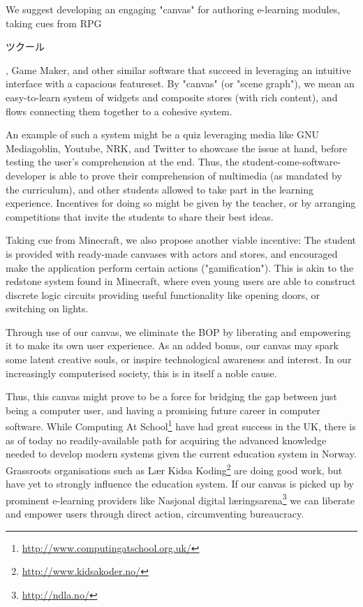 We suggest developing an engaging "canvas"  for authoring e-learning modules, 
taking cues from RPG\begin{CJK}{UTF8}{min}ツクール\end{CJK}, Game Maker, and 
other similar software that succeed in leveraging an intuitive interface with 
a capacious featureset. By "canvas" (or "scene graph"), we mean an 
easy-to-learn system of widgets and composite stores (with rich content), and 
flows connecting them together to a cohesive system. 

An example of such a system might be a quiz leveraging media like GNU 
Mediagoblin, Youtube, NRK, and Twitter to showcase the issue at hand, before 
testing the user's comprehension at the end. Thus, the 
student-come-software-developer is able to prove their comprehension of 
multimedia (as mandated by the curriculum), and other students allowed to take 
part in the learning experience. Incentives for doing so might be given by the 
teacher, or by arranging competitions that invite the students to share their 
best ideas.

Taking cue from Minecraft, we also propose another viable incentive: The student
is provided with ready-made canvases with actors and stores, and encouraged make
the application perform certain actions ("gamification"). This is akin to the
redstone system found in Minecraft, where even young users are able to construct
discrete logic circuits providing useful functionality like opening doors, or
switching on lights.

Through use of our canvas, we eliminate the BOP by liberating and empowering 
it to make its own user experience. As an added bonus, our canvas may spark 
some latent creative souls, or inspire technological awareness and interest. 
In our increasingly computerised society, this is in itself a noble cause. 

Thus, this canvas might prove to be a force for bridging the gap between just 
being a computer user, and having a promising future career in computer 
software. While Computing At 
School\footnote{\url{http://www.computingatschool.org.uk/}} have had great 
success in the UK, there is as of today no readily-available path for 
acquiring the advanced knowledge needed to develop modern systems given the 
current education system in Norway. Grassroots organisations such as Lær Kidsa 
Koding\footnote{\url{http://www.kidsakoder.no/}} are doing good work, but have 
yet to strongly influence the education system. If our canvas is picked up by 
prominent e-learning providers like Nasjonal digital 
læringsarena\footnote{\url{http://ndla.no/}} we can liberate and empower users 
through direct action, circumventing bureaucracy.

